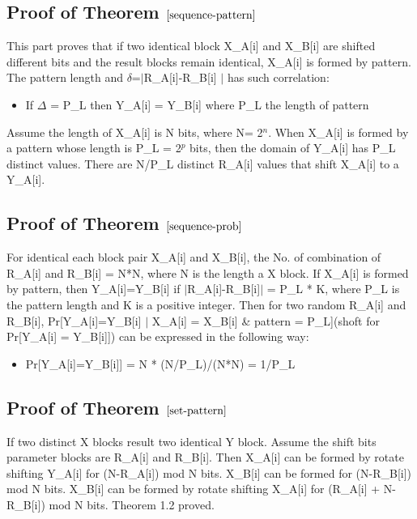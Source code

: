\documentclass{article}
\begin{document}
\subsection{Proof of Theorem $\ref{sequence-pattern}$}
This part proves that if two identical block X\_A[i]  and X\_B[i] are shifted different bits and the result blocks remain identical, X\_A[i] is formed by pattern. The pattern length and $\delta$=$\mid$R\_A[i]-R\_B[i] $\mid$ has such correlation:
\begin{itemize}
	\item If $\Delta$ = P\_L then Y\_A[i] = Y\_B[i] where P\_L the length of pattern
\end{itemize}
Assume the length of X\_A[i] is N bits, where N= 2$^n$. When X\_A[i] is formed by a pattern whose length is P\_L = 2$^p$ bits, then the domain of Y\_A[i] has P\_L distinct values. There are N/P\_L distinct R\_A[i] values that shift X\_A[i] to a Y\_A[i].  

\subsection{Proof of Theorem $\ref{sequence-prob}$}
For identical each block pair X\_A[i] and X\_B[i], the No. of combination of R\_A[i] and R\_B[i] = N*N, where N is the length a X block. 
If X\_A[i] is formed by pattern, then Y\_A[i]=Y\_B[i] if $\mid$R\_A[i]-R\_B[i]$\mid$ = P\_L * K, where P\_L is the pattern length and K is a positive integer. 
Then for two random R\_A[i] and R\_B[i], Pr[Y\_A[i]=Y\_B[i] $\mid$ X\_A[i] = X\_B[i] \& pattern = P\_L](shoft for Pr[Y\_A[i] = Y\_B[i]]) can be expressed in the following way:
\begin{itemize}
	\item Pr[Y\_A[i]=Y\_B[i]] = N * (N/P\_L)/(N*N) = 1/P\_L
\end{itemize} 

\subsection{Proof of Theorem $\ref{set-pattern}$}
If two distinct X blocks result two identical Y block. Assume the shift bits parameter blocks are R\_A[i] and R\_B[i]. Then X\_A[i] can be formed by rotate shifting Y\_A[i] for (N-R\_A[i]) mod N bits. X\_B[i] can be formed for (N-R\_B[i]) mod N bits.
X\_B[i] can be formed by rotate shifting X\_A[i] for (R\_A[i] + N-R\_B[i]) mod N bits. Theorem 1.2 proved.

\end{document}
